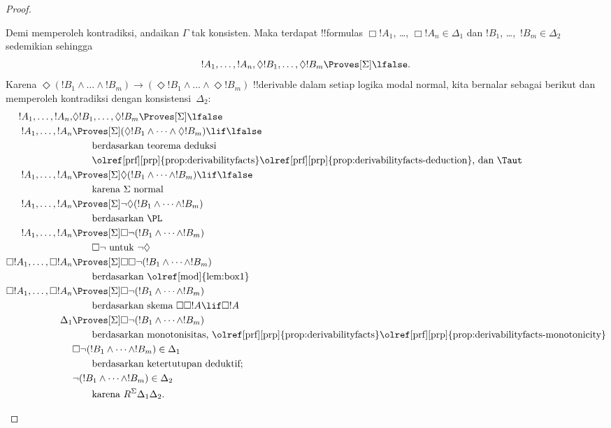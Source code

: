 \documentclass[../../../include/open-logic-section]{subfiles}
\begin{document}
\begin{proof}
\begin{enumerate}
    Demi memperoleh kontradiksi, andaikan $\Gamma$ tak konsisten. Maka
    terdapat !!{formula}s $\Box!A_1$, \dots, $\Box!A_n \in \Delta_1$
    dan $!B_1$, \dots,~$!B_m \in \Delta_2$ sedemikian sehingga
    \[!A_1, \dots, !A_n, \Diamond!B_1, \dots, \Diamond!B_m \Proves[\Sigma]
    \lfalse.\] Karena $\Diamond (!B_1 \land \dots \land !B_m) \to
    (\Diamond!B_1 \land \dots \land \Diamond!B_m)$ !!{derivable} dalam
    setiap logika modal normal, kita bernalar sebagai berikut dan memperoleh
    kontradiksi dengan konsistensi~$\Delta_2$:
    \begin{align*}
      !A_1, \dots, !A_n, & \Diamond!B_1, \dots,
      \Diamond!B_m \Proves[\Sigma] \lfalse \\
      !A_1, \dots,!A_n & \Proves[\Sigma] (\Diamond!B_1 \land
      \dots \land \Diamond!B_m) \lif \lfalse\\
      & \qquad\text{berdasarkan teorema deduksi}\\
      & \qquad\text{\olref[prf][prp]{prop:derivabilityfacts}\olref[prf][prp]{prop:derivabilityfacts-deduction}, dan \Taut} \\
      !A_1, \dots,!A_n & \Proves[\Sigma]
      \Diamond(!B_1 \land
      \dots \land !B_m) \lif \lfalse\\
      & \qquad \text{karena $\Sigma$ normal} \\
      !A_1, \dots,!A_n & \Proves[\Sigma]
      \lnot\Diamond (!B_1 \land \dots \land !B_m)\\
      & \qquad\text{berdasarkan \PL} \\
      !A_1, \dots,!A_n & \Proves[\Sigma]
      \Box\lnot (!B_1 \land \dots \land !B_m)\\
      & \qquad\text{$\Box\lnot$ untuk $\lnot\Diamond$} \\
      \Box!A_1, \dots,\Box!A_n
      & \Proves[\Sigma] \Box\Box \lnot (!B_1 \land \dots \land !B_m)\\
      & \qquad\text{berdasarkan \olref[mod]{lem:box1}} \\
      \Box!A_1, \dots,\Box!A_n
      & \Proves[\Sigma]
      \Box\lnot (!B_1 \land \dots \land !B_m)\\
      &\qquad\text{berdasarkan skema $\Box\Box!A \lif \Box!A$} \\
      \Delta_1 & \Proves[\Sigma]
      \Box\lnot (!B_1 \land \dots \land !B_m)\\
      &\qquad\text{berdasarkan monotonisitas, \olref[prf][prp]{prop:derivabilityfacts}\olref[prf][prp]{prop:derivabilityfacts-monotonicity}} \\
      & \Box\lnot (!B_1 \land \dots \land !B_m) \in \Delta_1\\
      &\qquad\text{berdasarkan ketertutupan deduktif}; \\
      & \lnot (!B_1 \land \dots \land !B_m) \in \Delta_2\\
      &\qquad \text{karena }
      R^\Sigma \Delta_1\Delta_2.
    \end{align*}
  \end{enumerate}
\end{proof}
\end{document}
